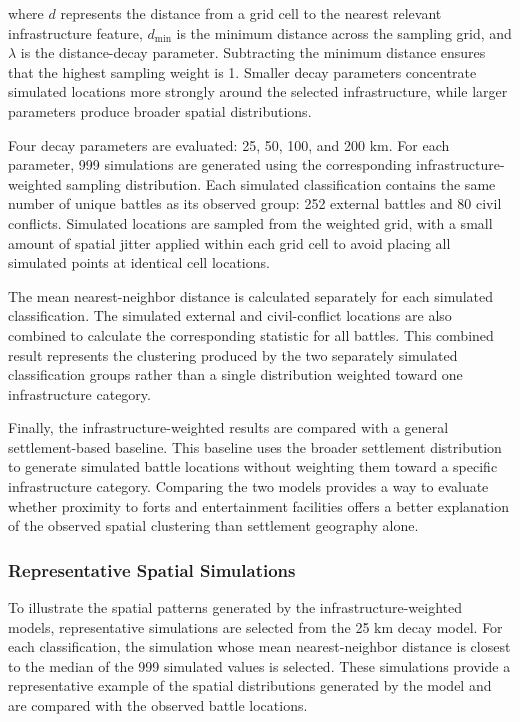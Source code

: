 \documentclass[
  letterpaper,
  DIV=11,
  numbers=noendperiod]{scrartcl}
\begin{document}
where \(d\) represents the distance from a grid cell to the nearest
relevant infrastructure feature, \(d_{\min}\) is the minimum distance
across the sampling grid, and \(\lambda\) is the distance-decay
parameter. Subtracting the minimum distance ensures that the highest
sampling weight is 1. Smaller decay parameters concentrate simulated
locations more strongly around the selected infrastructure, while larger
parameters produce broader spatial distributions.

Four decay parameters are evaluated: 25, 50, 100, and 200 km. For each
parameter, 999 simulations are generated using the corresponding
infrastructure-weighted sampling distribution. Each simulated
classification contains the same number of unique battles as its
observed group: 252 external battles and 80 civil conflicts. Simulated
locations are sampled from the weighted grid, with a small amount of
spatial jitter applied within each grid cell to avoid placing all
simulated points at identical cell locations.

The mean nearest-neighbor distance is calculated separately for each
simulated classification. The simulated external and civil-conflict
locations are also combined to calculate the corresponding statistic for
all battles. This combined result represents the clustering produced by
the two separately simulated classification groups rather than a single
distribution weighted toward one infrastructure category.

Finally, the infrastructure-weighted results are compared with a general
settlement-based baseline. This baseline uses the broader settlement
distribution to generate simulated battle locations without weighting
them toward a specific infrastructure category. Comparing the two models
provides a way to evaluate whether proximity to forts and entertainment
facilities offers a better explanation of the observed spatial
clustering than settlement geography alone.

\subsubsection{Representative Spatial
Simulations}\label{representative-spatial-simulations}

To illustrate the spatial patterns generated by the
infrastructure-weighted models, representative simulations are selected
from the 25 km decay model. For each classification, the simulation
whose mean nearest-neighbor distance is closest to the median of the 999
simulated values is selected. These simulations provide a representative
example of the spatial distributions generated by the model and are
compared with the observed battle locations.
\end{document}

